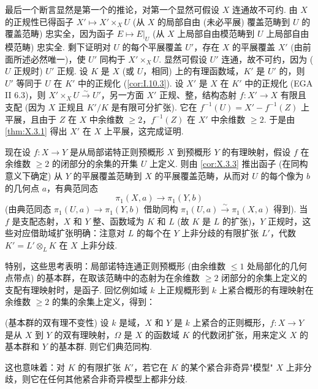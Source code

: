 最后一个断言显然是第一个的推论，对第一个显然可假设 $X$ 连通故不可约. 由 $X$ 的正规性已得函子 $X' \mapsto X' \times_X U$ (从 $X$ 的局部自由 (未必平展) 覆盖范畴到 $U$ 的覆盖范畴) 忠实全，因为函子 $E \mapsto E|_U$ (从 $X$ 上局部自由模范畴到 $U$ 上局部自由模范畴) 忠实全. 剩下证明对 $U$ 的每个平展覆盖 $U'$，存在 $X$ 的平展覆盖 $X'$ (由前面所述必然唯一)，使 $U'$ 同构于 $X' \times_X U$. 显然可假设 $U'$ 连通，故不可约，因为 ($U$ 正规时) $U'$ 正规. 设 $K$ 是 $X$ (或 $U$，相同) 上的有理函数域，$K'$ 是 $U'$ 的，则 $U'$ 等同于 $U$ 在 $K'$ 中的正规化 (\cref{cor:I.10.3}). 设 $X'$ 是 $X$ 在 $K'$ 中的正规化 (EGA II 6.3)，则 $X' \times_X U \xrightarrow{\sim} U'$，另一方面 $X'$ 正规、整，结构态射 $f \colon X' \to X$ 有限且支配 (因为 $X$ 正规且 $K'/K$ 是有限可分扩张). 它在 $f^{-1}(U) = X' - f^{-1}(Z)$ 上平展，且由于 $Z$ 在 $X$ 中余维数 $\geqslant 2$，$f^{-1}(Z)$ 在 $X'$ 中余维数 $\geqslant 2$. 于是由 \ref{thm:X.3.1} 得出 $X'$ 在 $X$ 上平展，这完成证明.

现在设 $f \colon X \to Y$ 是从局部诺特正则预概形 $X$ 到预概形 $Y$ 的有理映射，假设 $f$ 在余维数 $\geqslant 2$ 的闭部分的余集的开集 $U$ 上定义. 则由 \ref{cor:X.3.3} 推出函子 (在同构意义下确定) 从 $Y$ 的平展覆盖范畴到 $X$ 的平展覆盖范畴，从而对 $U$ 的每个像为 $b$ 的几何点 $a$，有典范同态
\[
\pi_1(X, a) \longrightarrow \pi_1(Y, b)
\]
(由典范同态 $\pi_1(U, a) \to \pi_1(Y, b)$ 借助同构 $\pi_1(U, a) \xrightarrow{\sim} \pi_1(X, a)$ 得到). 当 $f$ 是支配态射，$X$ 和 $Y$ 整、函数域为 $K$ 和 $L$ (故 $K$ 是 $L$ 的扩张)，$Y$ 正规时，这些对应借助域扩张明确：注意对 $L$ 的每个在 $Y$ 上非分歧的有限扩张 $L'$，代数 $K' = L' \otimes_L K$ 在 $X$ 上非分歧.

特别，这些思考表明：局部诺特连通正则预概形 (由余维数 $\leqslant 1$ 处局部化的几何点带点) 的基本群，在取该范畴中的态射为在余维数 $\geqslant 2$ 闭部分的余集上定义的支配有理映射时，是函子. 回忆例如域 $k$ 上正规概形到 $k$ 上紧合概形的有理映射在余维数 $\geqslant 2$ 的集的余集上定义，得到：

\begin{corollary}\label{cor:X.3.4}
(基本群的双有理不变性) 设 $k$ 是域，$X$ 和 $Y$ 是 $k$ 上紧合的正则概形，$f \colon X \to Y$ 是从 $X$ 到 $Y$ 的双有理映射，$\Omega$ 是 $X$ 的函数域 $K$ 的代数闭扩张，用来定义 $X$ 的基本群和 $Y$ 的基本群. 则它们典范同构.
\end{corollary}

这也意味着：对 $K$ 的有限扩张 $K'$，若它在 $K$ 的某个紧合非奇异"模型" $X$ 上非分歧，则它在任何其他紧合非奇异模型上都非分歧.

